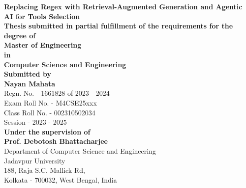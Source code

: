 \thispagestyle{empty}
\begin{center}
    \vspace*{1.5cm}
    \LARGE\textbf{Replacing Regex with Retrieval-Augmented Generation and Agentic AI for Tools  Selection} \\
    
    \vspace{1.2cm}
    \large\textbf{Thesis submitted in partial fulfillment of the requirements for the degree of} \\
    
    \vspace{0.1cm}
    \LARGE\textbf{Master of Engineering} \\
    
    \vspace{0.2cm}
    \Large\textbf{in} \\
    
    \vspace{0.2cm}
    \LARGE\textbf{Computer Science and Engineering} \\
    
    \vspace{2.0cm}
    \large\textbf{Submitted by} \\
    
    \vspace{0.2cm}
    \Large\textbf{Nayan Mahata} \\
    \large Regn. No. - 1661828 of 2023 - 2024 \\
    Exam Roll No. - M4CSE25xxx \\
    Class Roll No. - 002310502034 \\
    Session - 2023 - 2025 \\
    
    \vspace{1.5cm}
    \large\textbf{Under the supervision of} \\
    
    \vspace{0.3cm}
    \Large\textbf{Prof. Debotosh Bhattacharjee} \\
    
    \vspace{2cm}
    \large Department of Computer Science and Engineering \\
    Jadavpur University \\
    
    \vspace{0.5cm}
    188, Raja S.C. Mallick Rd, \\
    Kolkata - 700032, West Bengal, India \\
\end{center}